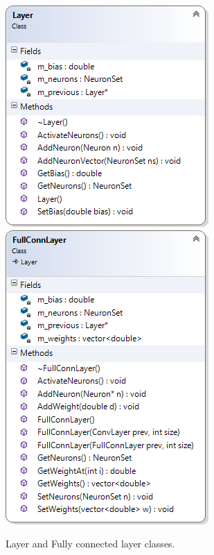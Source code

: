 \documentclass[10pt]{article}
\begin{document}
		\begin{figure}[h]
			\includegraphics[scale=0.9]{img/classLayer}
			\includegraphics[scale=0.9]{img/classFCLayer}
			\caption{Layer and Fully connected layer classes.}
			\label{fig:lcd}				
		\end{figure}
		
\end{document}
